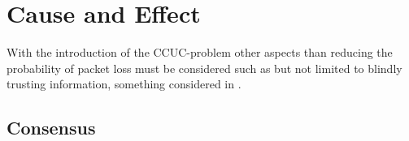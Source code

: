 \section{Cause and Effect}
With the introduction of the CCUC-problem other aspects than reducing the probability of packet loss must be considered such as but not limited to blindly trusting information, something considered in .

\subsection{Consensus}\label{consensus}

